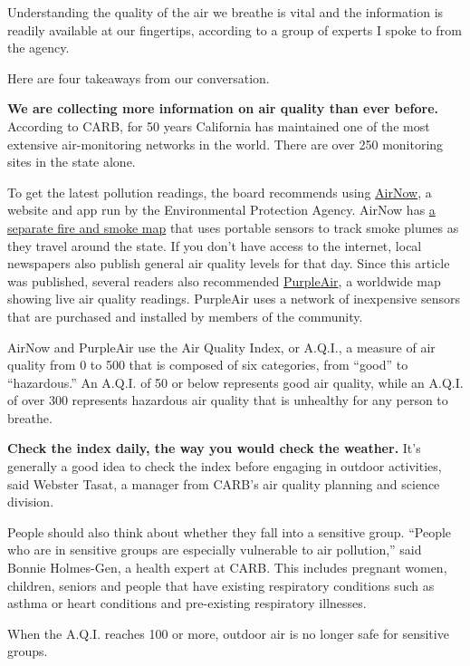 Understanding the quality of the air we breathe is vital and the
information is readily available at our fingertips, according to a group
of experts I spoke to from the agency.

Here are four takeaways from our conversation.

\textbf{We are collecting more information on air quality than ever
before.} According to CARB, for 50 years California has maintained one
of the most extensive air-monitoring networks in the world. There are
over 250 monitoring sites in the state alone.

To get the latest pollution readings, the board recommends using
\href{https://www.airnow.gov/}{AirNow}, a website and app run by the
Environmental Protection Agency. AirNow has
\href{https://fire.airnow.gov/?lat=38.5712128\&lng=-121.4021632\&zoom=10}{a
separate fire and smoke map} that uses portable sensors to track smoke
plumes as they travel around the state. If you don't have access to the
internet, local newspapers also publish general air quality levels for
that day. Since this article was published, several readers also
recommended \href{https://www.purpleair.com/map\#1/14.8/-30}{PurpleAir},
a worldwide map showing live air quality readings. PurpleAir uses a
network of inexpensive sensors that are purchased and installed by
members of the community.

AirNow and PurpleAir use the Air Quality Index, or A.Q.I., a measure of
air quality from 0 to 500 that is composed of six categories, from
``good'' to ``hazardous.'' An A.Q.I. of 50 or below represents good air
quality, while an A.Q.I. of over 300 represents hazardous air quality
that is unhealthy for any person to breathe.

\textbf{Check the index daily, the way you would check the weather.}
It's generally a good idea to check the index before engaging in outdoor
activities, said Webster Tasat, a manager from CARB's air quality
planning and science division.

People should also think about whether they fall into a sensitive group.
``People who are in sensitive groups are especially vulnerable to air
pollution,'' said Bonnie Holmes-Gen, a health expert at CARB. This
includes pregnant women, children, seniors and people that have existing
respiratory conditions such as asthma or heart conditions and
pre-existing respiratory illnesses.

When the A.Q.I. reaches 100 or more, outdoor air is no longer safe for
sensitive groups.

